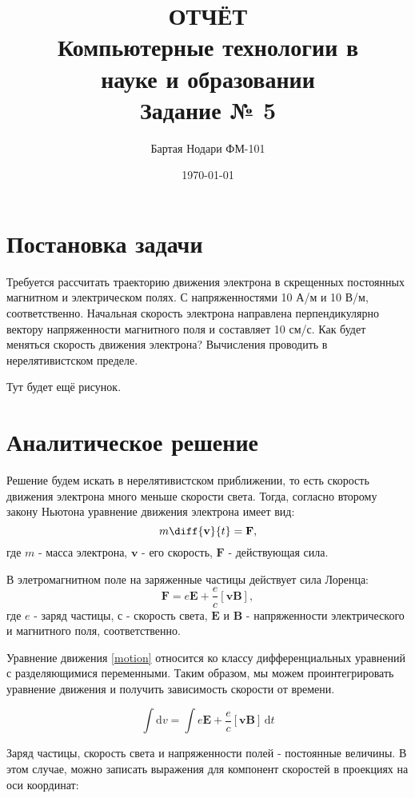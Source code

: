\documentclass[a4paper]{article}
\author{Бартая Нодари ФМ-101}
\title{ОТЧЁТ\\ Компьютерные технологии в\\ науке и образовании\\ Задание № 5}
\date{\today}
\begin{document}
\maketitle

\section{Постановка задачи}

Требуется рассчитать траекторию движения электрона в скрещенных
постоянных магнитном и электрическом полях. 
С напряженностями 10 А/м и 10 В/м, соответственно. 
Начальная скорость электрона направлена перпендикулярно вектору напряженности магнитного поля и составляет 10 см/с. 
Как будет меняться скорость движения электрона? 
Вычисления проводить в нерелятивистском пределе.

Тут будет ещё рисунок.

\section{Аналитическое решение}
Решение будем искать в нерелятивистском приближении, то есть скорость движения электрона много меньше скорости света. Тогда, согласно второму закону Ньютона уравнение движения электрона имеет вид:
\begin{equation}\label{motion}
m\diff{\mathbf{v}}{t} = \mathbf{F},
\end{equation}
где $m$ - масса электрона, $\mathbf{v}$ - его скорость, $\mathbf{F}$ - действующая сила.

В элетромагнитном поле на заряженные частицы действует сила Лоренца:
\begin{equation}\label{lorenz}
\mathbf{F} = e \mathbf{E} + \frac{e}{c}\left[\mathbf{vB}\right],
\end{equation}
где $e$ - заряд частицы, $с$ - скорость света, $\mathbf{E}$ и $\mathbf{B}$ - напряженности электрического и магнитного поля, соответственно.

Уравнение движения \eqref{motion} относится ко классу дифференциальных уравнений с разделяющимися переменными. Таким образом, мы можем проинтегрировать уравнение движения и получить зависимость скорости от времени.

\begin{equation}\label{intmotion}
\int \mathrm{d}v =\int e \mathbf{E} + \frac{e}{c}\left[\mathbf{vB}\right] \, \mathrm{d}t
\end{equation}

Заряд частицы, скорость света и напряженности полей - постоянные величины. В этом случае, можно записать выражения для компонент скоростей в проекциях на оси координат:
\end{document}
